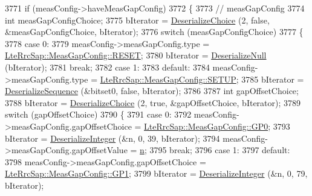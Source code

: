 \begin{DoxyCode}
3771   \textcolor{keywordflow}{if} (measConfig->haveMeasGapConfig)
3772     \{
3773       \textcolor{comment}{// measGapConfig}
3774       \textcolor{keywordtype}{int} measGapConfigChoice;
3775       bIterator = \hyperlink{classns3_1_1Asn1Header_a0af5881f07a0549a8693a1b75c229a90}{DeserializeChoice} (2, \textcolor{keyword}{false}, &measGapConfigChoice, bIterator);
3776       \textcolor{keywordflow}{switch} (measGapConfigChoice)
3777         \{
3778         \textcolor{keywordflow}{case} 0:
3779           measConfig->measGapConfig.type = \hyperlink{structns3_1_1LteRrcSap_1_1MeasGapConfig_a704e54a827261e3ea77ed61bc2ec9d87aab6f2aea8bc6dd72ff68288133307efc}{LteRrcSap::MeasGapConfig::RESET};
3780           bIterator = \hyperlink{classns3_1_1Asn1Header_a29bd4508f3f1ef636b3480f524fac0ce}{DeserializeNull} (bIterator);
3781           \textcolor{keywordflow}{break};
3782         \textcolor{keywordflow}{case} 1:
3783         \textcolor{keywordflow}{default}:
3784           measConfig->measGapConfig.type = \hyperlink{structns3_1_1LteRrcSap_1_1MeasGapConfig_a704e54a827261e3ea77ed61bc2ec9d87ae426e9b0efc8024b0342d189218a3ad3}{LteRrcSap::MeasGapConfig::SETUP};
3785           bIterator = \hyperlink{classns3_1_1Asn1Header_a58c68bb97ba3fe2e8fcdd7c208d672b2}{DeserializeSequence} (&bitset0, \textcolor{keyword}{false}, bIterator);
3786 
3787           \textcolor{keywordtype}{int} gapOffsetChoice;
3788           bIterator = \hyperlink{classns3_1_1Asn1Header_a0af5881f07a0549a8693a1b75c229a90}{DeserializeChoice} (2, \textcolor{keyword}{true}, &gapOffsetChoice, bIterator);
3789           \textcolor{keywordflow}{switch} (gapOffsetChoice)
3790             \{
3791             \textcolor{keywordflow}{case} 0:
3792               measConfig->measGapConfig.gapOffsetChoice = 
      \hyperlink{structns3_1_1LteRrcSap_1_1MeasGapConfig_a6e7b5e6cff6ff55fc54c397416804218abbf9ea4bfafedc8047d4f3d0d5dcc061}{LteRrcSap::MeasGapConfig::GP0};
3793               bIterator = \hyperlink{classns3_1_1Asn1Header_a49802c9af30018b078150e866b6ecae2}{DeserializeInteger} (&n, 0, 39, bIterator);
3794               measConfig->measGapConfig.gapOffsetValue = \hyperlink{namespacesample-rng-plot_aeb5ee5c431e338ef39b7ac5431242e1d}{n};
3795               \textcolor{keywordflow}{break};
3796             \textcolor{keywordflow}{case} 1:
3797             \textcolor{keywordflow}{default}:
3798               measConfig->measGapConfig.gapOffsetChoice = 
      \hyperlink{structns3_1_1LteRrcSap_1_1MeasGapConfig_a6e7b5e6cff6ff55fc54c397416804218aa24e9711cfb0bd2bcffca1630d6fe8b2}{LteRrcSap::MeasGapConfig::GP1};
3799               bIterator = \hyperlink{classns3_1_1Asn1Header_a49802c9af30018b078150e866b6ecae2}{DeserializeInteger} (&n, 0, 79, bIterator);

\end{DoxyCode}
